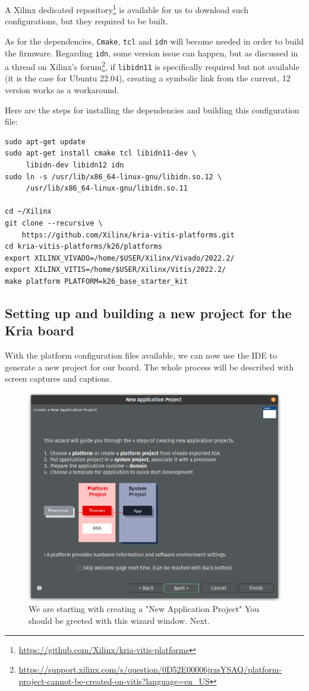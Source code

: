 \documentclass[10pt]{article}
\begin{document}
A Xilinx dedicated repository\footnote{\url{https://github.com/Xilinx/kria-vitis-platforms}} is available for us to download  such configurations,
but they required to be built.

As for the dependencies, \texttt{Cmake}, \texttt{tcl} and \texttt{idn} will become needed in order to build the firmware.
Regarding \texttt{idn}, some version issue can happen, but as discussed in a thread on Xilinx's forum\footnote{\url{https://support.xilinx.com/s/question/0D52E00006jrzsYSAQ/platform-project-cannot-be-created-on-vitis?language=en\_US}},
if \texttt{libidn11} is specifically required but not available (it is the case for Ubuntu 22.04),
creating a symbolic link from the current, 12 version works as a workaround.

Here are the steps for installing the dependencies and building this configuration file:

\begin{verbatim}
sudo apt-get update
sudo apt-get install cmake tcl libidn11-dev \
     libidn-dev libidn12 idn
sudo ln -s /usr/lib/x86_64-linux-gnu/libidn.so.12 \
     /usr/lib/x86_64-linux-gnu/libidn.so.11

cd ~/Xilinx
git clone --recursive \
    https://github.com/Xilinx/kria-vitis-platforms.git
cd kria-vitis-platforms/k26/platforms
export XILINX_VIVADO=/home/$USER/Xilinx/Vivado/2022.2/
export XILINX_VITIS=/home/$USER/Xilinx/Vitis/2022.2/
make platform PLATFORM=k26_base_starter_kit
\end{verbatim}

\subsection{Setting up and building a new project for the Kria board}
\label{sec:org425cdae}
With the platform configuration files available, we can now use the IDE to generate a
new project for our board. The whole process will be described with screen captures and
captions.

\begin{figure}[htbp]
\centering
\includegraphics[width=.6\textwidth]{./img/vitis_new/project1.png}
\caption{\label{fig:orgc867cae}We are starting with creating a "New Application Project" You should be greeted with this wizard window. Next.}
\end{figure}
\end{document}
